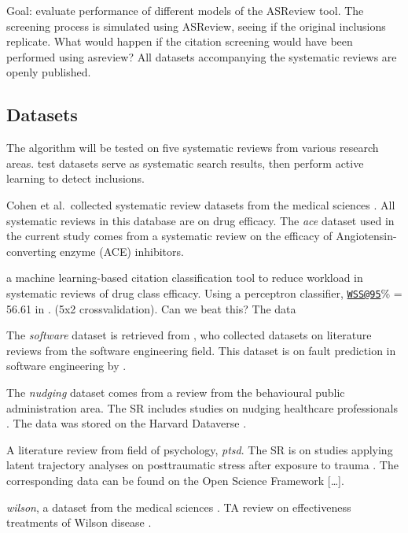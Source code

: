 \documentclass[
]{article}
\begin{document}
Goal: evaluate performance of different models of the ASReview tool. The
screening process is simulated using ASReview, seeing if the original
inclusions replicate. What would happen if the citation screening would
have been performed using asreview? All datasets accompanying the
systematic reviews are openly published.

\hypertarget{datasets}{%
\subsection{Datasets}\label{datasets}}

The algorithm will be tested on five systematic reviews from various
research areas. test datasets serve as systematic search results, then
perform active learning to detect inclusions.

Cohen et al.~collected systematic review datasets from the medical
sciences \autocite{Cohen2006}. All systematic reviews in this database
are on drug efficacy. The \emph{ace} dataset used in the current study
comes from a systematic review on the efficacy of Angiotensin-converting
enzyme (ACE) inhibitors.

a machine learning-based citation classification tool to reduce workload
in systematic reviews of drug class efficacy. Using a perceptron
classifier, \href{mailto:WSS@95}{\nolinkurl{WSS@95}}\% = 56.61 in
\autocite{Cohen2006}. (5x2 crossvalidation). Can we beat this? The data

The \emph{software} dataset is retrieved from \autocite{Yu2018a}, who
collected datasets on literature reviews from the software engineering
field. This dataset is on fault prediction in software engineering by
\autocite{Hall2012}.

The \emph{nudging} dataset comes from a review from the behavioural
public administration area. The SR includes studies on nudging
healthcare professionals \autocite{Nagtegaal2019}. The data was stored
on the Harvard Dataverse \autocite{Nagtegaal2019a}.

A literature review from field of psychology, \emph{ptsd}. The SR is on
studies applying latent trajectory analyses on posttraumatic stress
after exposure to trauma \autocite{vandeSchoot2017}. The corresponding
data can be found on the Open Science Framework {[}\ldots{]}.

\emph{wilson}, a dataset from the medical sciences
\autocite{Appenzeller-Herzog2020}. TA review on effectiveness treatments
of Wilson disease \autocite{Appenzeller-Herzog2019}.
\end{document}
